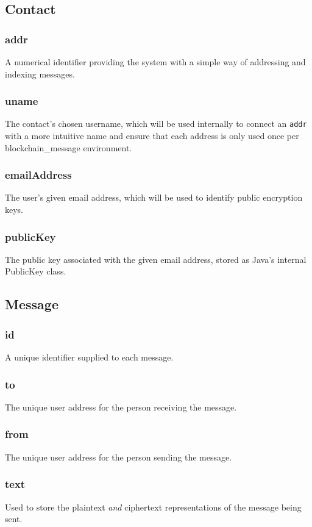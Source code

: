 \documentclass[titlepage]{report}
\begin{document}
\subsection{Contact}
\subsubsection{addr}
A numerical identifier providing the system with a simple way of addressing and indexing messages.

\subsubsection{uname}
The contact's chosen username, which will be used internally to connect an \texttt{addr} with a more intuitive name and ensure that each address is only used once per blockchain\_message environment.

\subsubsection{emailAddress}
The user's given email address, which will be used to identify public encryption keys.

\subsubsection{publicKey}
The public key associated with the given email address, stored as Java's internal PublicKey class.

\subsection{Message}
\subsubsection{id}
A unique identifier supplied to each message.

\subsubsection{to}
The unique user address for the person receiving the message.

\subsubsection{from}
The unique user address for the person sending the message.

\subsubsection{text}
Used to store the plaintext \textit{and} ciphertext representations of the message being sent.
\end{document}
